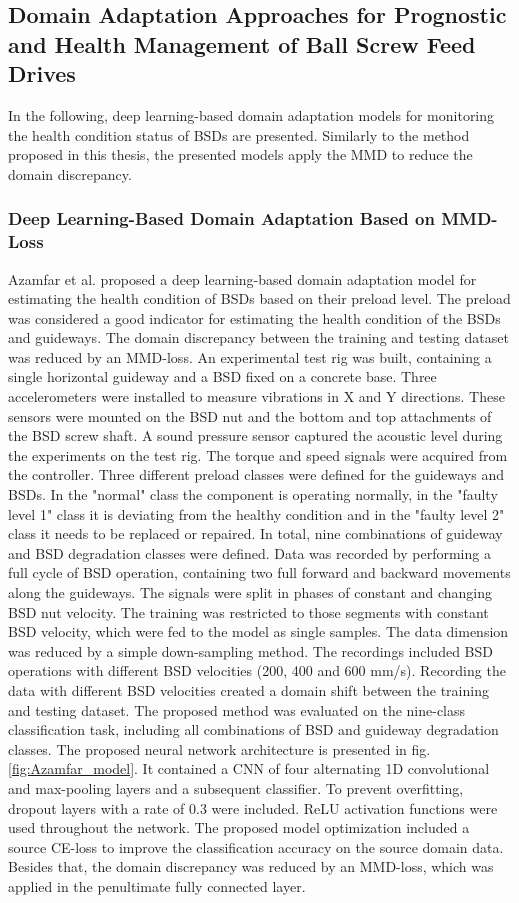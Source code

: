 \subsection{Domain Adaptation Approaches for Prognostic and Health Management of Ball Screw Feed Drives}
In the following, deep learning-based domain adaptation models for monitoring the health condition status of BSDs are presented. Similarly to the method proposed in this thesis, the presented models apply the MMD to reduce the domain discrepancy.


\subsubsection{Deep Learning-Based Domain Adaptation Based on MMD-Loss}
Azamfar et al. \cite{AZAMFAR2020103932} proposed a deep learning-based domain adaptation model for estimating the health condition of BSDs based on their preload level. The preload was considered a good indicator for estimating the health condition of the BSDs and guideways. The domain discrepancy between the training and testing dataset was reduced by an MMD-loss. An experimental test rig was built, containing a single horizontal guideway and a BSD fixed on a concrete base. Three accelerometers were installed to measure vibrations in X and Y directions. These sensors were mounted on the BSD nut and the bottom and top attachments of the BSD screw shaft. A sound pressure sensor captured the acoustic level during the experiments on the test rig. The torque and speed signals were acquired from the controller. Three different preload classes were defined for the guideways and BSDs. In the "normal" class the component is operating normally, in the "faulty level 1" class it is deviating from the healthy condition and in the "faulty level 2" class it needs to be replaced or repaired. In total, nine combinations of guideway and BSD degradation classes were defined. Data was recorded by performing a full cycle of BSD operation, containing two full forward and backward movements along the guideways. The signals were split in phases of constant and changing BSD nut velocity. The training was restricted to those segments with constant BSD velocity, which were fed to the model as single samples. The data dimension was reduced by a simple down-sampling method. The recordings included BSD operations with different BSD velocities (200, 400 and 600 mm/s). Recording the data with different BSD velocities created a domain shift between the training and testing dataset. The proposed method was evaluated on the nine-class classification task, including all combinations of BSD and guideway degradation classes. The proposed neural network architecture is presented in fig. \ref{fig:Azamfar_model}. It contained a CNN of four alternating 1D convolutional and max-pooling layers and a subsequent classifier. To prevent overfitting, dropout layers with a rate of 0.3 were included. ReLU activation functions were used throughout the network. The proposed model optimization included a source CE-loss to improve the classification accuracy on the source domain data. Besides that, the domain discrepancy was reduced by an MMD-loss, which was applied in the penultimate fully connected layer. 

